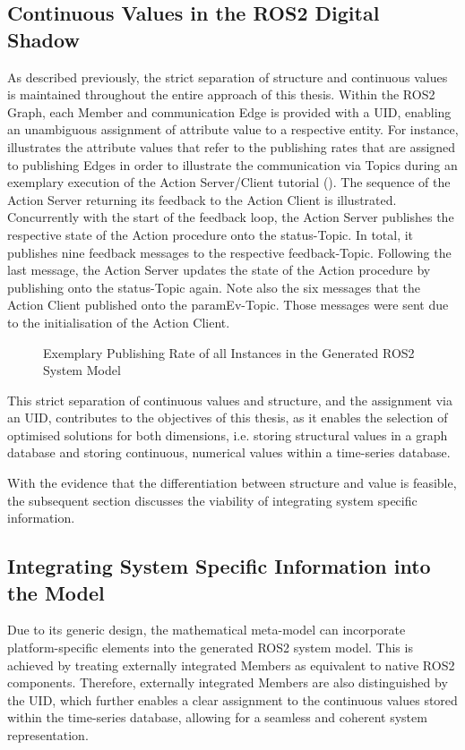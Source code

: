     \subsection{Continuous Values in the ROS2 Digital Shadow} \label{sec:eval:continuousValues}
        As described previously, the strict separation of structure and continuous values is maintained throughout the entire approach of this thesis. Within the ROS2 Graph, each Member and communication Edge is provided with a UID, enabling an unambiguous assignment of attribute value to a respective entity. For instance,  illustrates the attribute values that refer to the publishing rates that are assigned to publishing Edges in order to illustrate the communication via Topics during an exemplary execution of the Action Server/Client tutorial (). The sequence of the Action Server returning its feedback to the Action Client is illustrated. Concurrently with the start of the feedback loop, the Action Server publishes the respective state of the Action procedure onto the \glqq{}status\grqq{}-Topic. In total, it publishes nine feedback messages to the respective \glqq{}feedback\grqq{}-Topic. Following the last message, the Action Server updates the state of the Action procedure by publishing onto the \glqq{}status\grqq{}-Topic again. Note also the six messages that the Action Client published onto the \glqq{}paramEv\grqq{}-Topic. Those messages were sent due to the initialisation of the Action Client.
        \begin{figure}[h]
            \centering
            
            \caption{Exemplary Publishing Rate of all Instances in the Generated ROS2 System Model} \label{fig:tikz:eval:continuousValues}
        \end{figure}\newline
        This strict separation of continuous values and structure, and the assignment via an UID, contributes to the objectives of this thesis, as it enables the selection of optimised solutions for both dimensions, i.e. storing structural values in a graph database and storing continuous, numerical values within a time-series database.


    With the evidence that the differentiation between structure and value is feasible, the subsequent section discusses the viability of integrating system specific information.


    \subsection{Integrating System Specific Information into the Model} \label{subsec:eval:integratingInformation}
        Due to its generic design, the mathematical meta-model can incorporate platform-specific elements into the generated ROS2 system model. This is achieved by treating externally integrated Members as equivalent to native ROS2 components. Therefore, externally integrated Members are also distinguished by the UID, which further enables a clear assignment to the continuous values stored within the time-series database, allowing for a seamless and coherent system representation.


